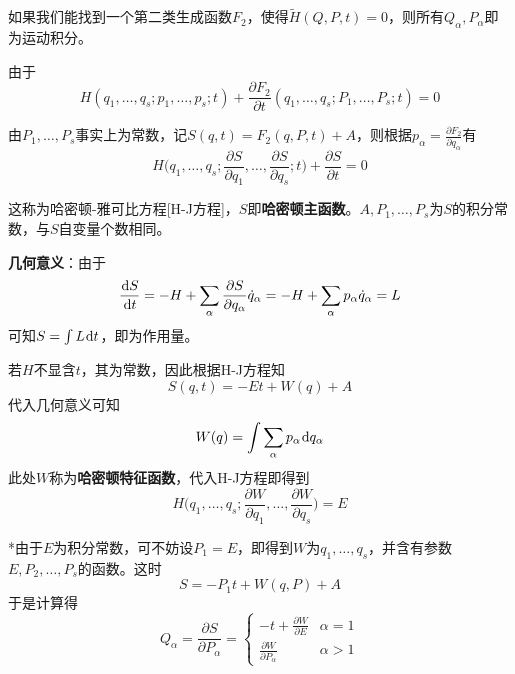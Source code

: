 \documentclass[a4paper,UTF8,fontset=windows]{ctexart}
\newcommand*{\dr}{\hspace{0.07em}\mathrm{d}}
\begin{document}
如果我们能找到一个第二类生成函数$F_2$，使得$\tilde{H}(Q,P,t)=0$，则所有$Q_\alpha,P_\alpha$即为运动积分。

由于
$$H(q_1,\dots,q_s;p_1,\dots,p_s;t)+\frac{\partial F_2}{\partial t}(q_1,\dots,q_s;P_1,\dots,P_s;t)=0$$

由$P_1,\dots,P_s$事实上为常数，记$S(q,t)=F_2(q,P,t)+A$，则根据$p_\alpha=\frac{\partial F_2}{\partial q_\alpha}$有
$$H\bigg(q_1,\dots,q_s;\frac{\partial S}{\partial q_1},\dots,\frac{\partial S}{\partial q_s};t\bigg)+\frac{\partial S}{\partial t}=0$$

这称为哈密顿-雅可比方程[H-J方程]，$S$即\textbf{哈密顿主函数}。$A,P_1,\dots,P_s$为$S$的积分常数，与$S$自变量个数相同。

\textbf{几何意义}：由于
$$\frac{\dr S}{\dr t}=-H+\sum_\alpha\frac{\partial S}{\partial q_\alpha}\dot{q}_\alpha=-H+\sum_\alpha p_\alpha\dot{q}_\alpha=L$$
可知$S=\int L\dr t$，即为作用量。

若$H$不显含$t$，其为常数，因此根据H-J方程知
$$S(q,t)=-Et+W(q)+A$$
代入几何意义可知
$$W(q)=\int\sum_\alpha p_\alpha\dr q_\alpha$$
此处$W$称为\textbf{哈密顿特征函数}，代入H-J方程即得到
$$H\bigg(q_1,\dots,q_s;\frac{\partial W}{\partial q_1},\dots,\frac{\partial W}{\partial q_s}\bigg)=E$$

*由于$E$为积分常数，可不妨设$P_1=E$，即得到$W$为$q_1,\dots,q_s$，并含有参数$E,P_2,\dots,P_s$的函数。这时
$$S=-P_1t+W(q,P)+A$$
于是计算得
$$Q_\alpha=\frac{\partial S}{\partial P_\alpha}=\begin{cases}-t+\frac{\partial W}{\partial E}&\alpha=1\\\frac{\partial W}{\partial P_\alpha}&\alpha>1\end{cases}$$

\
\end{document}
